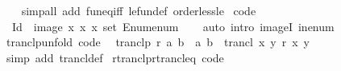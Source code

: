 \begin{isabellebody}
%
\isadelimproof
\ \ %
\endisadelimproof
%
\isatagproof
{}\isamarkupfalse%
\ {\isacharparenleft}{\kern0pt}simp{\isacharunderscore}{\kern0pt}all\ add{\isacharcolon}{\kern0pt}\ fun{\isacharunderscore}{\kern0pt}eq{\isacharunderscore}{\kern0pt}iff\ le{\isacharunderscore}{\kern0pt}fun{\isacharunderscore}{\kern0pt}def\ order{\isacharunderscore}{\kern0pt}less{\isacharunderscore}{\kern0pt}le{\isacharparenright}{\kern0pt}%
\endisatagproof
{\isafoldproof}%
%
\isadelimproof
%
\endisadelimproof
%
\isadelimdocument
%
\endisadelimdocument
%
\isatagdocument
%
\isamarkuptrue%
%
\endisatagdocument
{\isafolddocument}%
%
\isadelimdocument
%
\endisadelimdocument
{}\isamarkupfalse%
\ {\isacharbrackleft}{\kern0pt}code{\isacharbrackright}{\kern0pt}{\isacharcolon}{\kern0pt}\isanewline
\ \ {\isachardoublequoteopen}Id\ {\isacharequal}{\kern0pt}\ image\ {\isacharparenleft}{\kern0pt}{\isasymlambda}x{\isachardot}{\kern0pt}\ {\isacharparenleft}{\kern0pt}x{\isacharcomma}{\kern0pt}\ x{\isacharparenright}{\kern0pt}{\isacharparenright}{\kern0pt}\ {\isacharparenleft}{\kern0pt}set\ Enum{\isachardot}{\kern0pt}enum{\isacharparenright}{\kern0pt}{\isachardoublequoteclose}\isanewline
%
\isadelimproof
\ \ %
\endisadelimproof
%
\isatagproof
{}\isamarkupfalse%
\ {\isacharparenleft}{\kern0pt}auto\ intro{\isacharcolon}{\kern0pt}\ imageI\ in{\isacharunderscore}{\kern0pt}enum{\isacharparenright}{\kern0pt}%
\endisatagproof
{\isafoldproof}%
%
\isadelimproof
\isanewline
%
\endisadelimproof
\isanewline
{}\isamarkupfalse%
\ tranclp{\isacharunderscore}{\kern0pt}unfold\ {\isacharbrackleft}{\kern0pt}code{\isacharbrackright}{\kern0pt}{\isacharcolon}{\kern0pt}\isanewline
\ \ {\isachardoublequoteopen}tranclp\ r\ a\ b\ {\isasymlongleftrightarrow}\ {\isacharparenleft}{\kern0pt}a{\isacharcomma}{\kern0pt}\ b{\isacharparenright}{\kern0pt}\ {\isasymin}\ trancl\ {\isacharbraceleft}{\kern0pt}{\isacharparenleft}{\kern0pt}x{\isacharcomma}{\kern0pt}\ y{\isacharparenright}{\kern0pt}{\isachardot}{\kern0pt}\ r\ x\ y{\isacharbraceright}{\kern0pt}{\isachardoublequoteclose}\isanewline
%
\isadelimproof
\ \ %
\endisadelimproof
%
\isatagproof
{}\isamarkupfalse%
\ {\isacharparenleft}{\kern0pt}simp\ add{\isacharcolon}{\kern0pt}\ trancl{\isacharunderscore}{\kern0pt}def{\isacharparenright}{\kern0pt}%
\endisatagproof
{\isafoldproof}%
%
\isadelimproof
\isanewline
%
\endisadelimproof
\isanewline
{}\isamarkupfalse%
\ rtranclp{\isacharunderscore}{\kern0pt}rtrancl{\isacharunderscore}{\kern0pt}eq\ {\isacharbrackleft}{\kern0pt}code{\isacharbrackright}{\kern0pt}{\isacharcolon}{\kern0pt}\isanewline

\end{isabellebody}
